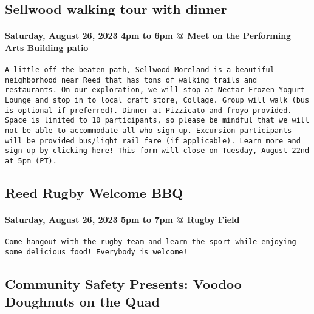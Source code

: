 \documentclass[
]{article}
\begin{document}
\hypertarget{sellwood-walking-tour-with-dinner}{%
\subsection{Sellwood walking tour with
dinner}\label{sellwood-walking-tour-with-dinner}}

\hypertarget{saturday-august-26-2023-4pm-to-6pm-meet-on-the-performing-arts-building-patio}{%
\paragraph{Saturday, August 26, 2023 4pm to 6pm @ Meet on the Performing
Arts Building
patio}\label{saturday-august-26-2023-4pm-to-6pm-meet-on-the-performing-arts-building-patio}}

\begin{verbatim}
A little off the beaten path, Sellwood-Moreland is a beautiful neighborhood near Reed that has tons of walking trails and restaurants. On our exploration, we will stop at Nectar Frozen Yogurt Lounge and stop in to local craft store, Collage. Group will walk (bus is optional if preferred). Dinner at Pizzicato and froyo provided. Space is limited to 10 participants, so please be mindful that we will not be able to accommodate all who sign-up. Excursion participants will be provided bus/light rail fare (if applicable). Learn more and sign-up by clicking here! This form will close on Tuesday, August 22nd at 5pm (PT).
\end{verbatim}

\hypertarget{reed-rugby-welcome-bbq}{%
\subsection{Reed Rugby Welcome BBQ}\label{reed-rugby-welcome-bbq}}

\hypertarget{saturday-august-26-2023-5pm-to-7pm-rugby-field}{%
\paragraph{Saturday, August 26, 2023 5pm to 7pm @ Rugby
Field}\label{saturday-august-26-2023-5pm-to-7pm-rugby-field}}

\begin{verbatim}
Come hangout with the rugby team and learn the sport while enjoying some delicious food! Everybody is welcome!
\end{verbatim}

\hypertarget{community-safety-presents-voodoo-doughnuts-on-the-quad}{%
\subsection{Community Safety Presents: Voodoo Doughnuts on the
Quad}\label{community-safety-presents-voodoo-doughnuts-on-the-quad}}
\end{document}
